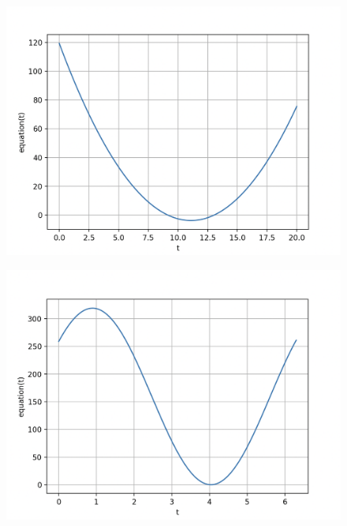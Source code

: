 \documentclass[titlepage]{article}
\begin{document}
\begin{figure}[H]
  \centering
  \begin{minipage}[t]{.4\textwidth}
    \centering
    \includegraphics[width=1\linewidth]{Images/speedup_euclidean_graph.png}
    \label{fig:Speedup euclidean graph}
  \end{minipage}%
  \hspace{0.04\textwidth} %
  \begin{minipage}[t]{.4\textwidth}
    \centering
    \includegraphics[width=1\linewidth]{Images/speedup_2sphere_graph.png}
    \label{fig:Speedup 2sphere graph}
  \end{minipage}
\end{figure}
\end{document}
